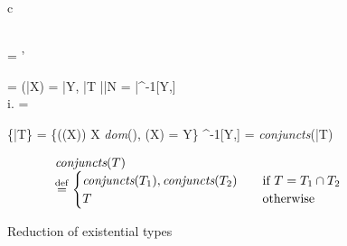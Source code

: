 \begin{figure}[t]
\begin{tabular}{c}
\begin{minipage}{.45\textwidth}
\infrule
  {}
  {}

% 

\infrule
  { \\
   \jcsolve{\C}{\phi} \andalso \phi[\Delta] = \Delta'}
  {}


\infrule
  {\Delta = 
      \andalso \phi(\bar{X}) = \bar{Y}, \bar{T}
      \andalso \bar{\bar{N}} = \bar{\phi^{-1}[Y,\Delta]} \\[.2em]
    \forall i. \quad {}}
  {\phi[\Delta] = }


\infrule
  {\{\bar{T}\} = \{\phi(\Delta(X)) \mid X \in \textit{dom}(\Delta),\; \phi(X) = Y\}}
  {\phi^{-1}[Y,\Delta] = \textit{conjuncts}(\bigcap \bar{T})}

\vspace*{-1em}
\[
\begin{array}{l}
\textit{conjuncts}(T)\\
\overset{\mathrm{def}}{=}
  \begin{cases}
    \textit{conjuncts}(T_1), \textit{conjuncts}(T_2)\quad & \text{if } T = T_1 \cap T_2 \\
    T & \text{otherwise}
  \end{cases}
\end{array}
\]
\end{minipage}
\end{tabular}
  \caption{Reduction of existential types}
  \label{fig:exred}
\end{figure}

